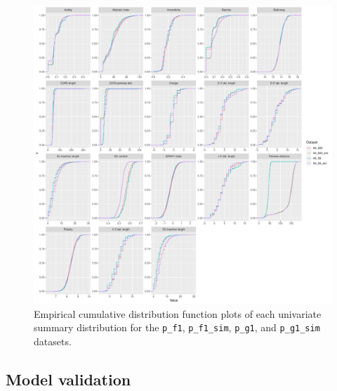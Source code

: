 \documentclass{article}
\begin{document}
\begin{figure}
    \includegraphics[width=\linewidth]{Figures/igor_ecdf.pdf}
    \caption{Empirical cumulative distribution function plots of each univariate summary distribution for the \texttt{p\_f1}, \texttt{p\_f1\_sim}, \texttt{p\_g1}, and \texttt{p\_g1\_sim} datasets.}
    \label{fig:IgorECDFs}
\end{figure}

\subsection*{Model validation}
\end{document}
